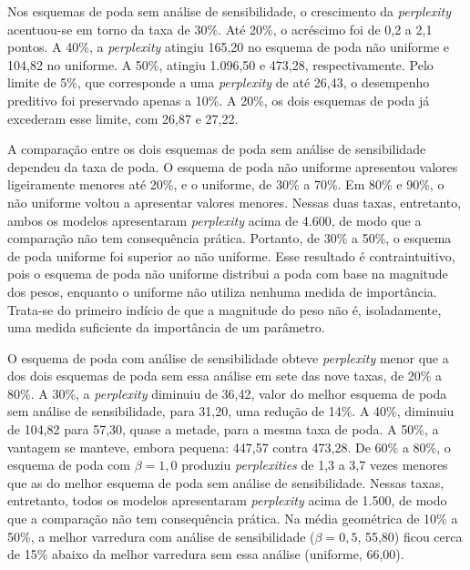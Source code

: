 Nos esquemas de poda sem análise de sensibilidade, o crescimento da \textit{perplexity}
acentuou-se em torno da taxa de 30\%. Até 20\%, o acréscimo foi de 0,2 a 2,1 pontos. A 40\%, a
\textit{perplexity} atingiu 165,20 no esquema de poda não uniforme e 104,82 no uniforme. A
50\%, atingiu 1.096,50 e 473,28, respectivamente. Pelo limite de 5\%,
que corresponde a uma \textit{perplexity} de até 26,43,
o desempenho preditivo foi preservado apenas a 10\%. A 20\%, os dois esquemas de poda já
excederam esse limite, com 26,87 e 27,22.

A comparação entre os dois esquemas de poda sem análise de sensibilidade dependeu da taxa de
poda. O esquema de poda não uniforme apresentou valores ligeiramente menores até 20\%, e o
uniforme, de 30\% a 70\%. Em 80\% e 90\%, o não uniforme voltou a apresentar valores menores.
Nessas duas taxas, entretanto, ambos os modelos apresentaram \textit{perplexity} acima de
4.600, de modo que a comparação não tem consequência prática. Portanto, de 30\% a 50\%, o
esquema de poda uniforme foi superior ao não uniforme. Esse resultado é contraintuitivo, pois o
esquema de poda não uniforme distribui a poda com base na magnitude dos pesos, enquanto o
uniforme não utiliza nenhuma medida de importância. Trata-se do primeiro indício de que a
magnitude do peso não é, isoladamente, uma medida suficiente da importância de um parâmetro.

O esquema de poda com análise de sensibilidade obteve \textit{perplexity} menor que a dos dois
esquemas de poda sem essa análise em sete das nove taxas, de 20\% a 80\%. A 30\%, a
\textit{perplexity} diminuiu de 36,42, valor do melhor esquema de poda sem análise de
sensibilidade, para 31,20, uma redução de 14\%. A 40\%, diminuiu de 104,82 para 57,30, quase a
metade, para a mesma taxa de poda. A 50\%, a vantagem se manteve, embora pequena: 447,57 contra
473,28. De 60\% a 80\%, o esquema de poda com $\beta = 1{,}0$ produziu \textit{perplexities} de
1,3 a 3,7 vezes menores que as do melhor esquema de poda sem análise de sensibilidade. Nessas
taxas, entretanto, todos os modelos apresentaram \textit{perplexity} acima de 1.500, de modo
que a comparação não tem consequência prática. Na média geométrica de 10\% a 50\%,
a melhor varredura com análise de sensibilidade ($\beta
= 0{,}5$, 55,80) ficou cerca de 15\% abaixo da melhor varredura sem essa análise (uniforme,
66,00).

